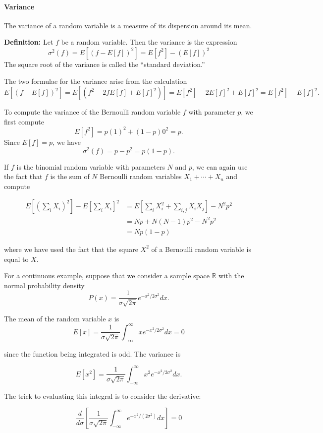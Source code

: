 \documentclass[
]{article}
\begin{document}
\hypertarget{variance}{%
\paragraph{Variance}\label{variance}}

The variance of a random variable is a measure of its dispersion around
its mean.

\textbf{Definition:} Let \(f\) be a random variable. Then the variance
is the expression \[
\sigma^2(f) = E[(f-E[f])^2]=E[f^2]-(E[f])^2
\] The square root of the variance is called the ``standard deviation.''

The two formulae for the variance arise from the calculation \[
E[(f-E[f])^2]=E[(f^2-2fE[f]+E[f]^2)]=E[f^2]-2E[f]^2+E[f]^2=E[f^2]-E[f]^2.
\]

To compute the variance of the Bernoulli random variable \(f\) with
parameter \(p\), we first compute \[
E[f^2]=p(1)^2+(1-p)0^2=p.
\] Since \(E[f]=p\), we have \[
\sigma^2(f)=p-p^2=p(1-p).
\]

If \(f\) is the binomial random variable with parameters \(N\) and
\(p\), we can again use the fact that \(f\) is the sum of \(N\)
Bernoulli random variables \(X_1+\cdots+X_n\) and compute

\begin{align*}
E[(\sum_{i}X_i)^2]-E[\sum_{i} X_{i}]^2 &=E[\sum_{i} X_i^2+\sum_{i,j}X_{i}X_{j}]-N^2p^2\\
&=Np+N(N-1)p^2-N^2p^2 \\
&=Np(1-p)
\end{align*}

where we have used the fact that the square \(X^2\) of a Bernoulli
random variable is equal to \(X\).

For a continuous example, suppose that we consider a sample space
\(\mathbb{R}\) with the normal probability density \[
P(x) = \frac{1}{\sigma\sqrt{2\pi}}e^{-x^2/2\sigma^2}dx.
\]

The mean of the random variable \(x\) is \[
E[x] =\frac{1}{\sigma\sqrt{2\pi}}\int_{-\infty}^{\infty} xe^{-x^2/2\sigma^2}dx=0
\]

since the function being integrated is odd. The variance is

\[
E[x^2] = \frac{1}{\sigma\sqrt{2\pi}}\int_{-\infty}^{\infty} x^2e^{-x^2/2\sigma^2}dx.
\]

The trick to evaluating this integral is to consider the derivative:

\[
\frac{d}{d\sigma}\left[\frac{1}{\sigma\sqrt{2\pi}}\int_{-\infty}^{\infty}e^{-x^2/(2\sigma^2)}dx\right]=0
\]
\end{document}
